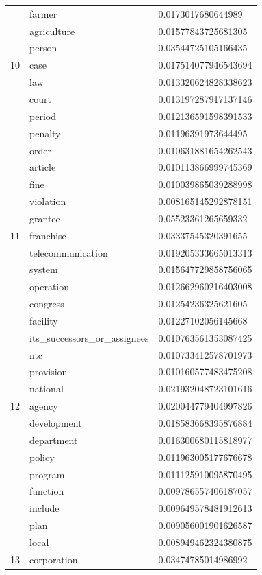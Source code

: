 \documentclass[conference]{IEEEtran}
\begin{document}
\begin{center}
\begin{longtable}{|l|l|l|}
& farmer & 0.0173017680644989 \\
& agriculture & 0.01577843725681305 \\
\hline
\multirow{3}{4em}{10} & person & 0.03544725105166435 \\
& case & 0.017514077946543694 \\
& law & 0.013320624828338623 \\
& court & 0.013197287917137146 \\
& period & 0.012136591598391533 \\
& penalty & 0.01196391973644495 \\
& order & 0.010631881654262543 \\
& article & 0.010113866999745369 \\
& fine & 0.010039865039288998 \\
& violation & 0.008165145292878151 \\
\hline
\multirow{3}{4em}{11} & grantee & 0.05523361265659332 \\
& franchise & 0.03337545320391655 \\
& telecommunication & 0.019205333665013313 \\
& system & 0.015647729858756065 \\
& operation & 0.012662960216403008 \\
& congress & 0.01254236325621605 \\
& facility & 0.01227102056145668 \\
& its\_successors\_or\_assignees & 0.010763561353087425 \\
& ntc & 0.010733412578701973 \\
& provision & 0.010160577483475208 \\
\hline
\multirow{3}{4em}{12} & national & 0.021932048723101616 \\
& agency & 0.020044779404997826 \\
& development & 0.018583668395876884 \\
& department & 0.016300680115818977 \\
& policy & 0.011963005177676678 \\
& program & 0.011125910095870495 \\
& function & 0.009786557406187057 \\
& include & 0.009649578481912613 \\
& plan & 0.009056001901626587 \\
& local & 0.008949462324380875 \\
\hline
\multirow{3}{4em}{13} & corporation & 0.03474785014986992 \\

\end{longtable}
\end{center}
\end{document}
